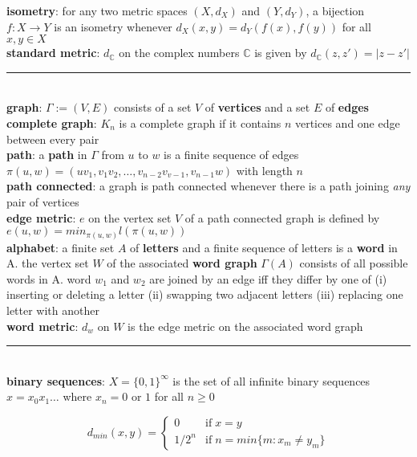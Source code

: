 \documentclass[a4paper]{article}
\newcommand*\abs[1]{\vert #1 \vert}
\newcommand*\linesep[0]{\noindent\rule{\textwidth}{0.5pt}\\}
\begin{document}
\begin{framed}
 	\noindent
 	\textbf{isometry}: for any two metric spaces $(X, d_X)$ and $(Y, d_Y)$, a bijection $f: X \rightarrow Y$ is an isometry whenever $d_X(x, y) = d_Y(f(x), f(y))$ for all $x, y \in X$\\
 	
 	\noindent
 	\textbf{standard metric}: $d_\mathbb{C}$ on the complex numbers $\mathbb{C}$ is given by $d_\mathbb{C}(z, z') = \abs{z - z'}$
 	
 	\linesep
 	\noindent
 	\textbf{graph}: $\Gamma := (V, E)$ consists of a set $V$ of \textbf{vertices} and a set $E$ of \textbf{edges}\\
 	
 	\noindent
 	\textbf{complete graph}: $K_n$ is a complete graph if it contains $n$ vertices and one edge between every pair\\
 	
 	\noindent
 	\textbf{path}: a \textbf{path} in $\Gamma$ from $u$ to $w$ is a finite sequence of edges $\pi(u, w) = (uv_1, v_1v_2, \dots, v_{n-2}v_{v-1}, v_{n-1}w)$ with length $n$\\
 	
 	\noindent
 	\textbf{path connected}: a graph is path connected whenever there is a path joining \textit{any} pair of vertices\\
 	
 	\noindent
 	\textbf{edge metric}: $e$ on the vertex set $V$ of a path connected graph is defined by $e(u, w) = min_{\pi(u, w)} l(\pi(u, w))$\\
 	
 	\noindent
 	\textbf{alphabet}: a finite set $A$ of \textbf{letters} and a finite sequence of letters is a \textbf{word} in A. the vertex set $W$ of the associated \textbf{word graph} $\Gamma(A)$ consists of all possible words in A. word $w_1$ and $w_2$ are joined by an edge iff they differ by one of (i) inserting or deleting a letter (ii) swapping two adjacent letters (iii) replacing one letter with another\\
 	
 	\noindent
 	\textbf{word metric}: $d_w$ on $W$ is the edge metric on the associated word graph
 	
 	\linesep
 	\noindent
 	\textbf{binary sequences}: $X = \{0, 1\}^\infty$ is the set of all infinite binary sequences $x = x_0x_1\dots$ where $x_n = 0$ or $1$ for all $n \geq 0$
 	 
 	\[ d_{min}(x, y) = \begin{cases} 
      0 & \text{if} \; x = y \\
      1/2^n & \text{if} \; n = min\{m : x_m \neq y_m\}
      \end{cases}
	\]
	

\end{framed}
\end{document}
